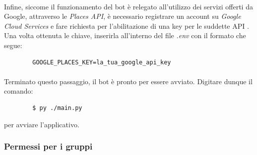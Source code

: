 \documentclass[a4paper, 12pt]{article}
\begin{document}
	\paragraph{}
	Infine, siccome il funzionamento del bot è relegato all'utilizzo dei servizi offerti da Google, attraverso le \textit{Places API}, è necessario registrare un account su \textit{Google Cloud Services} e fare richiesta per l'abilitazione di una key per le suddette API \cite{places_api_key_registration}.
	Una volta ottenuta le chiave, inserirla all'interno del file \textit{.env} con il formato che segue:
	\begin{verbatim}
		GOOGLE_PLACES_KEY=la_tua_google_api_key
	\end{verbatim}
	\paragraph{}
	Terminato questo passaggio, il bot è pronto per essere avviato. Digitare dunque il comando:
	\begin{verbatim}
		$ py ./main.py
	\end{verbatim}
	per avviare l'applicativo.
	\subsubsection{Permessi per i gruppi}
\end{document}
